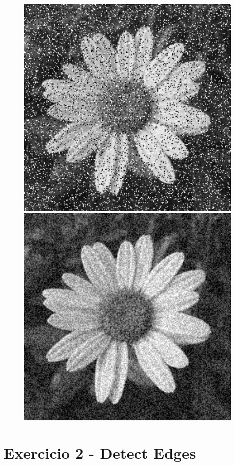 \documentclass[a4paper]{report}
\begin{document}
\begin{figure}[H]
    \centering
    \begin{minipage}{.5\textwidth}
        \centering
        \includegraphics[width=0.95\textwidth]{images/flower_salt-n-pepper_0.2.png}
    \end{minipage}%
    \begin{minipage}{.5\textwidth}
        \centering
        \includegraphics[width=0.95\textwidth]{images/flower_gaussian_0.2.png}
    \end{minipage}
\end{figure}

\chapter{Exercicio 2 - Detect Edges}
\end{document}
